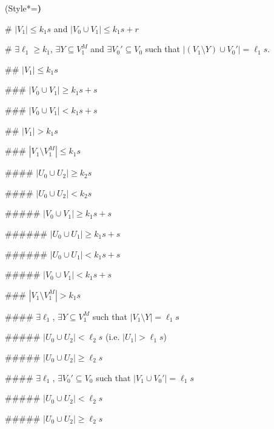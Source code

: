 \documentclass[oneside,12pt]{memoir}
\begin{document}
\begin{easylist} 

\ListProperties(Style*=\bfseries)

# $|V_1|\leq k_1s$ and $|V_0\cup V_1|\leq k_1s+r$
 
# $\exists \ell_1\geq k_1$, $\exists Y\subseteq V_1^M$ and $\exists V_0'\subseteq V_0$ such that $|(V_1\setminus Y)\cup V_0'|=\ell_1s$.  

## $|V_1|\leq k_1s$

### $|V_0\cup V_1|\geq k_1s+s$




### $|V_0\cup V_1|<k_1s+s$






## $|V_1|>k_1s$

### $|V_1\setminus V_1^M|\leq k_1s$

#### $|U_0\cup U_2|\geq k_2s$

#### $|U_0\cup U_2|<k_2s$ 

##### $|V_0\cup V_1|\geq k_1s+s$

###### $|U_0\cup U_1|\geq k_1s+s$

###### $|U_0\cup U_1|<k_1s+s$

##### $|V_0\cup V_1|<k_1s+s$

### $|V_1\setminus V_1^M|>k_1s$

#### $\exists \ell_1$, $\exists Y\subseteq V_1^M$ such that $|V_1\setminus Y|=\ell_1s$ 

##### $|U_0\cup U_2|< \ell_2s$ (i.e. $|U_1|>\ell_1s$)

##### $|U_0\cup U_2|\geq \ell_2s$

#### $\exists \ell_1$, $\exists V_0'\subseteq V_0$ such that $|V_1\cup V_0'|=\ell_1s$ 

##### $|U_0\cup U_2|<\ell_2 s$ 

##### $|U_0\cup U_2|\geq \ell_2 s$


\end{easylist}
\end{document}
